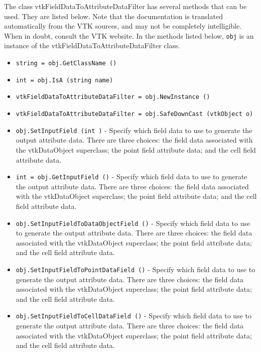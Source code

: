 The class vtkFieldDataToAttributeDataFilter has several methods that can be used.
  They are listed below.
Note that the documentation is translated automatically from the VTK sources,
and may not be completely intelligible.  When in doubt, consult the VTK website.
In the methods listed below, \verb|obj| is an instance of the vtkFieldDataToAttributeDataFilter class.
\begin{itemize}
\item  \verb|string = obj.GetClassName ()|

\item  \verb|int = obj.IsA (string name)|

\item  \verb|vtkFieldDataToAttributeDataFilter = obj.NewInstance ()|

\item  \verb|vtkFieldDataToAttributeDataFilter = obj.SafeDownCast (vtkObject o)|

\item  \verb|obj.SetInputField (int )| -  Specify which field data to use to generate the output attribute
 data. There are three choices: the field data associated with the
 vtkDataObject superclass; the point field attribute data; and the cell
 field attribute data.

\item  \verb|int = obj.GetInputField ()| -  Specify which field data to use to generate the output attribute
 data. There are three choices: the field data associated with the
 vtkDataObject superclass; the point field attribute data; and the cell
 field attribute data.

\item  \verb|obj.SetInputFieldToDataObjectField ()| -  Specify which field data to use to generate the output attribute
 data. There are three choices: the field data associated with the
 vtkDataObject superclass; the point field attribute data; and the cell
 field attribute data.

\item  \verb|obj.SetInputFieldToPointDataField ()| -  Specify which field data to use to generate the output attribute
 data. There are three choices: the field data associated with the
 vtkDataObject superclass; the point field attribute data; and the cell
 field attribute data.

\item  \verb|obj.SetInputFieldToCellDataField ()| -  Specify which field data to use to generate the output attribute
 data. There are three choices: the field data associated with the
 vtkDataObject superclass; the point field attribute data; and the cell
 field attribute data.


\end{itemize}
